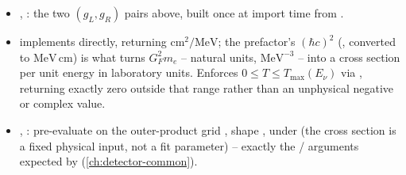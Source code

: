 \begin{implbox}
\begin{itemize}
  \item {}, : the two
    $(g_L,g_R)$ pairs above, built once at import time from
    .
  \item {} implements
     directly, returning $\mathrm{cm^2/MeV}$; the
    prefactor's $(\hbar c)^2$ (, converted
    to $\mathrm{MeV\,cm}$) is what turns $G_F^2 m_e$ -- natural units,
    $\mathrm{MeV^{-3}}$ -- into a cross section per unit energy in laboratory
    units. Enforces $0\leq T\leq T_{\max}(E_\nu)$ via
    , returning exactly zero outside that range rather
    than an unphysical negative or complex value.
  \item {},
    : pre-evaluate
     on the outer-product grid
    , shape ,
    under  (the cross section is a fixed physical
    input, not a fit parameter) -- exactly the /
     arguments expected by
    (\cref{ch:detector-common}).
\end{itemize}
\end{implbox}

